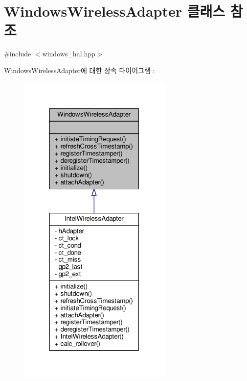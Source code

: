 \hypertarget{class_windows_wireless_adapter}{}\section{Windows\+Wireless\+Adapter 클래스 참조}
\label{class_windows_wireless_adapter}


{\ttfamily \#include $<$windows\+\_\+hal.\+hpp$>$}



Windows\+Wireless\+Adapter에 대한 상속 다이어그램 \+: 
\nopagebreak
\begin{figure}[H]
\begin{center}
\leavevmode
\includegraphics[width=217pt]{class_windows_wireless_adapter__inherit__graph}
\end{center}
\end{figure}


